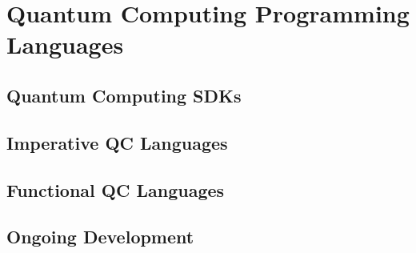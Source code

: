 \chapter{Quantum Computing Programming Languages}


\section{Quantum Computing SDKs}
\section{Imperative QC Languages}
\section{Functional QC Languages}
\section{Ongoing Development}